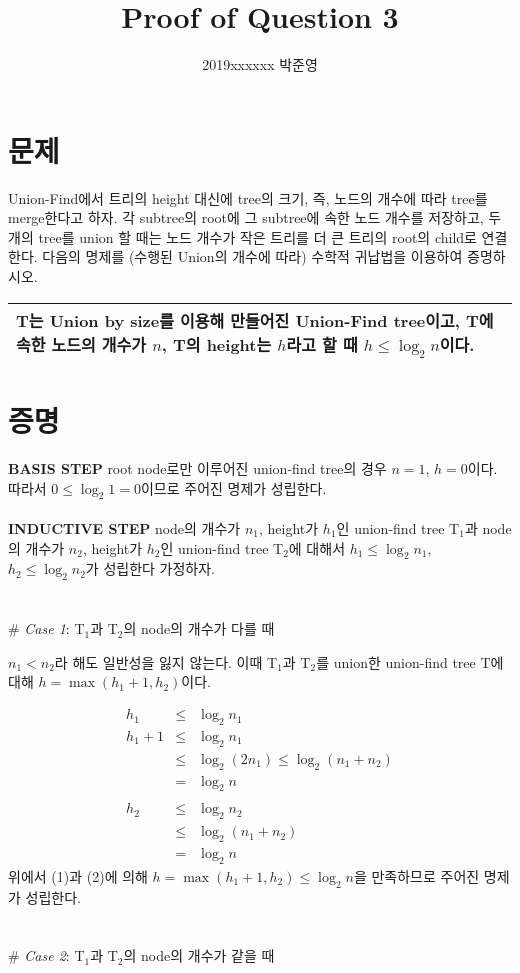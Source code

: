 \documentclass[a4page, 11pt]{article}
\title{Proof of Question 3}
\author{2019xxxxxx 박준영}
\date{} %
\newenvironment{textbox}
{
\begin{center}
\begin{tabular}{|p{0.95\textwidth}|}
\hline
}
{
\\ \hline
\end{tabular}
\end{center}
}
\begin{document}
\maketitle

\section{문제}

Union-Find에서 트리의 height 대신에 tree의 크기, 즉, 노드의 개수에 따라 tree를 merge한다고 하자. 각 subtree의 root에 그 subtree에 속한 노드 개수를 저장하고, 두 개의 tree를 union 할 때는 노드 개수가 작은 트리를 더 큰 트리의 root의 child로 연결한다. 다음의 명제를 (수행된 Union의 개수에 따라) 수학적 귀납법을 이용하여 증명하시오.\\

\begin{textbox}
T는 \textbf{Union by size}를 이용해 만들어진 Union-Find tree이고, T에 속한 노드의 개수가 $n$, T의 height는 $h$라고 할 때 $h \leq \log_2{n}$이다.
\end{textbox}

\section{증명}

\textbf{BASIS STEP} root node로만 이루어진 union-find tree의 경우 $n=1$, $h=0$이다. 따라서 $0 \leq \log_2{1} = 0$이므로 주어진 명제가 성립한다.\\
\\
\textbf{INDUCTIVE STEP} 
node의 개수가 $n_1$, height가 $h_1$인 union-find tree T$_1$과 node의 개수가 $n_2$, height가 $h_2$인 union-find tree T$_2$에 대해서 $h_1 \leq \log_2{n_1}$, $h_2 \leq \log_2{n_2}$가 성립한다 가정하자.
\\
\\
\\
\# \textit{Case 1}: T$_1$과 T$_2$의 node의 개수가 다를 때

$n_1 < n_2$라 해도 일반성을 잃지 않는다. 이때 T$_1$과 T$_2$를 union한 union-find tree T에 대해 $h = \max(h_1 + 1, h_2)$이다.

\begin{eqnarray}
h_1 &\leq& \log_2{n_1} \nonumber\\
h_1 + 1 &\leq& \log_2{n_1} \nonumber\\
&\leq& \log_2{(2n_1)} \leq \log_2{(n_1 + n_2)} \nonumber\\
&=& \log_2{n}\\
\nonumber \\
h_2 &\leq& \log_2{n_2} \nonumber\\
&\leq& \log_2{(n_1 + n_2)} \nonumber\\
&=& \log_2{n}
\end{eqnarray}
위에서 (1)과 (2)에 의해 $h=\max(h_1 + 1, h_2) \leq \log_2{n}$을 만족하므로 주어진 명제가 성립한다.
\\
\\
\\
\# \textit{Case 2}: T$_1$과 T$_2$의 node의 개수가 같을 때
\end{document}

